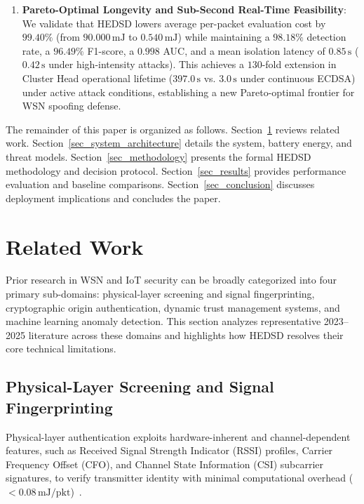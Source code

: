 \documentclass[conference]{IEEEtran}
\begin{document}
\begin{enumerate}
    \item \textbf{Pareto-Optimal Longevity and Sub-Second Real-Time Feasibility}: We validate that HEDSD lowers average per-packet evaluation cost by $99.40\%$ (from $90.000\,\text{mJ}$ to $0.540\,\text{mJ}$) while maintaining a $98.18\%$ detection rate, a $96.49\%$ F1-score, a $0.998$ AUC, and a mean isolation latency of $0.85\,\text{s}$ ($0.42\,\text{s}$ under high-intensity attacks). This achieves a $130$-fold extension in Cluster Head operational lifetime ($397.0\,\text{s}$ vs. $3.0\,\text{s}$ under continuous ECDSA) under active attack conditions, establishing a new Pareto-optimal frontier for WSN spoofing defense.
\end{enumerate}

The remainder of this paper is organized as follows. Section~\ref{sec_related_work} reviews related work. Section~\ref{sec_system_architecture} details the system, battery energy, and threat models. Section~\ref{sec_methodology} presents the formal HEDSD methodology and decision protocol. Section~\ref{sec_results} provides performance evaluation and baseline comparisons. Section~\ref{sec_conclusion} discusses deployment implications and concludes the paper.

\section{Related Work}
\label{sec_related_work}

Prior research in WSN and IoT security can be broadly categorized into four primary sub-domains: physical-layer screening and signal fingerprinting, cryptographic origin authentication, dynamic trust management systems, and machine learning anomaly detection. This section analyzes representative 2023–2025 literature across these domains and highlights how HEDSD resolves their core technical limitations.

\subsection{Physical-Layer Screening and Signal Fingerprinting}
Physical-layer authentication exploits hardware-inherent and channel-dependent features, such as Received Signal Strength Indicator (RSSI) profiles, Carrier Frequency Offset (CFO), and Channel State Information (CSI) subcarrier signatures, to verify transmitter identity with minimal computational overhead ($<0.08\,\text{mJ/pkt}$)~\cite{ref_yang_rssi_20, ref_liu_csi_21, ref_csi_fading_22}. 
\end{document}
